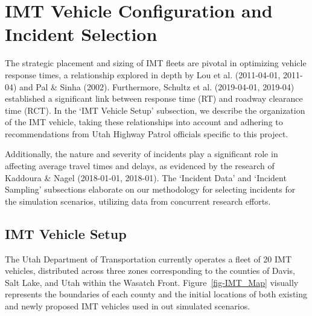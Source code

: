 \documentclass[fancy, oneside, mastersfancy, ms]{byuthesis}
\begin{document}
\hypertarget{imt-vehicle-configuration-and-incident-selection}{%
\section{IMT Vehicle Configuration and Incident
Selection}\label{imt-vehicle-configuration-and-incident-selection}}

The strategic placement and sizing of IMT fleets are pivotal in
optimizing vehicle response times, a relationship explored in depth by
Lou et al. (2011-04-01, 2011-04) and Pal \& Sinha (2002). Furthermore,
Schultz et al. (2019-04-01, 2019-04) established a significant link
between response time (RT) and roadway clearance time (RCT). In the `IMT
Vehicle Setup' subsection, we describe the organization of the IMT
vehicle, taking these relationships into account and adhering to
recommendations from Utah Highway Patrol officials specific to this
project.

Additionally, the nature and severity of incidents play a significant
role in affecting average travel times and delays, as evidenced by the
research of Kaddoura \& Nagel (2018-01-01, 2018-01). The `Incident Data'
and `Incident Sampling' subsections elaborate on our methodology for
selecting incidents for the simulation scenarios, utilizing data from
concurrent research efforts.

\hypertarget{imt-vehicle-setup}{%
\subsection{IMT Vehicle Setup}\label{imt-vehicle-setup}}

The Utah Department of Transportation currently operates a fleet of 20
IMT vehicles, distributed across three zones corresponding to the
counties of Davis, Salt Lake, and Utah within the Wasatch Front.
Figure~\ref{fig-IMT_Map} visually represents the boundaries of each
county and the initial locations of both existing and newly proposed IMT
vehicles used in out simulated scenarios.
\end{document}
